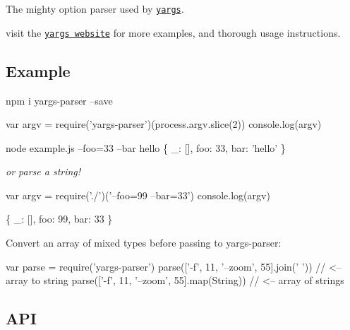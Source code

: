 \href{https://travis-ci.org/yargs/yargs-parser}{\tt } \href{https://coveralls.io/r/yargs/yargs-parser?branch=master}{\tt } \href{https://www.npmjs.com/package/yargs-parser}{\tt } \href{https://github.com/conventional-changelog/standard-version}{\tt }

The mighty option parser used by \href{https://github.com/yargs/yargs}{\tt yargs}.

visit the \href{http://yargs.js.org/}{\tt yargs website} for more examples, and thorough usage instructions.



\subsection*{Example}


\begin{DoxyCode}
npm i yargs-parser --save
\end{DoxyCode}



\begin{DoxyCode}
var argv = require('yargs-parser')(process.argv.slice(2))
console.log(argv)
\end{DoxyCode}



\begin{DoxyCode}
node example.js --foo=33 --bar hello
\{ \_: [], foo: 33, bar: 'hello' \}
\end{DoxyCode}


{\itshape or parse a string!}


\begin{DoxyCode}
var argv = require('./')('--foo=99 --bar=33')
console.log(argv)
\end{DoxyCode}



\begin{DoxyCode}
\{ \_: [], foo: 99, bar: 33 \}
\end{DoxyCode}


Convert an array of mixed types before passing to {\ttfamily yargs-\/parser}\+:


\begin{DoxyCode}
var parse = require('yargs-parser')
parse(['-f', 11, '--zoom', 55].join(' '))   // <-- array to string
parse(['-f', 11, '--zoom', 55].map(String)) // <-- array of strings
\end{DoxyCode}


\subsection*{A\+PI}

